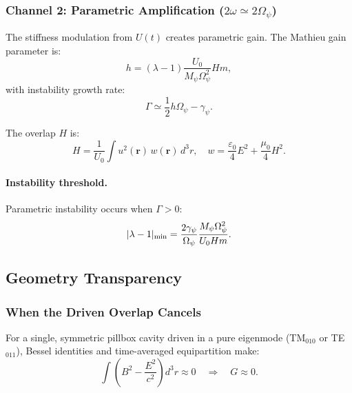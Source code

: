 \subsubsection{Channel 2: Parametric Amplification ($2\omega \simeq 2\Omega_\psi$)}

The stiffness modulation from $U(t)$ creates parametric gain. The Mathieu 
gain parameter is:
\begin{equation}
h = (\lambda - 1)\frac{U_0}{M_\psi\Omega_\psi^2}Hm,
\label{eq:mathieu-h}
\end{equation}
with instability growth rate:
\begin{equation}
\Gamma \simeq \frac{1}{2}h\Omega_\psi - \gamma_\psi.
\end{equation}

The overlap $H$ is:
\begin{equation}
H = \frac{1}{U_0}\int u^2(\mathbf{r})\,w(\mathbf{r})\,d^3r, \quad 
w = \frac{\varepsilon_0}{4}E^2 + \frac{\mu_0}{4}H^2.
\label{eq:overlap-H}
\end{equation}

\paragraph{Instability threshold.}
Parametric instability occurs when $\Gamma > 0$:
\begin{equation}
|\lambda - 1|_{\rm min} = \frac{2\gamma_\psi}{\Omega_\psi}\frac{M_\psi\Omega_\psi^2}{U_0 H m}.
\label{eq:instability-threshold}
\end{equation}

\subsection{Geometry Transparency}\label{sec:geometry}

\subsubsection{When the Driven Overlap Cancels}

For a single, symmetric pillbox cavity driven in a pure eigenmode (TM$_{010}$ 
or TE$_{011}$), Bessel identities and time-averaged equipartition make:
\begin{equation}
\int \left(B^2 - \frac{E^2}{c^2}\right) d^3r \approx 0 \quad \Rightarrow \quad G \approx 0.
\end{equation}

